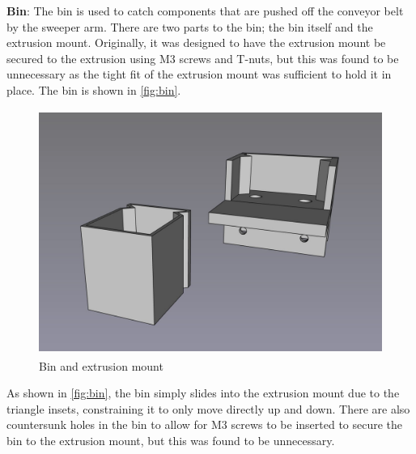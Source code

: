 \textbf{Bin}: The bin is used to catch components that are pushed off the conveyor belt by the sweeper arm. There are two parts to the bin; the bin itself and the extrusion mount. Originally, it was designed to have the extrusion mount be secured to the extrusion using M3 screws and T-nuts, but this was found to be unnecessary as the tight fit of the extrusion mount was sufficient to hold it in place. The bin is shown in \autoref{fig:bin}.

\begin{figure}[H]
    \begin{minipage}[h]{0.95\textwidth}
        \centering
        \includegraphics[height=8cm]{imgs/freecad/bin.jpg}
        \caption{Bin and extrusion mount}
        \label{fig:bin}
    \end{minipage}
\end{figure}

As shown in \autoref{fig:bin}, the bin simply slides into the extrusion mount due to the triangle insets, constraining it to only move directly up and down. There are also countersunk holes in the bin to allow for M3 screws to be inserted to secure the bin to the extrusion mount, but this was found to be unnecessary.
